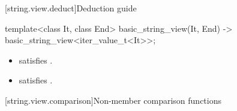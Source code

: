 [string.view.deduct]{Deduction guide}

\begin{itemdecl}
template<class It, class End>
  basic_string_view(It, End) -> basic_string_view<iter_value_t<It>>;
\end{itemdecl}

\begin{itemdescr}
\pnum
\constraints
\begin{itemize}
\item {} satisfies .
\item {} satisfies .
\end{itemize}
\end{itemdescr}

[string.view.comparison]{Non-member comparison functions}

